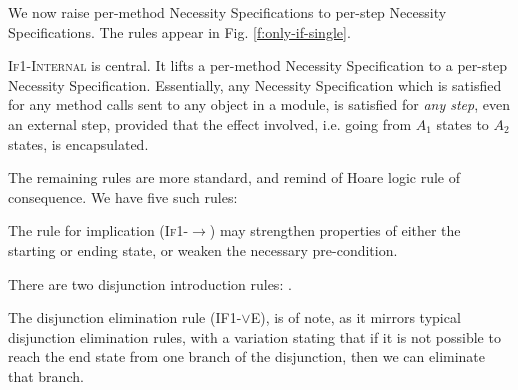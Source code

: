 We now raise per-method Necessity Specifications 
to per-step Necessity Specifications. 
The rules appear in Fig. \ref{f:only-if-single}.

\textsc{If1-Internal} is central. It
 lifts a per-method Necessity Specification to a per-step Necessity Specification.
Essentially, any Necessity Specification which is satisfied for any method
calls sent to any object in a module, is satisfied for \emph{any step}, even
an external step, provided that the effect involved, i.e. going from $A_1$ states to
$A_2$ states, is encapsulated.

 The remaining rules are more standard, and remind of Hoare logic rule of consequence.
 We have five such rules:
 
The  rule for implication (\textsc{If1-$\longrightarrow$}) may strengthen
 properties of either the starting or ending state, or 
weaken the necessary pre-condition. 

There are two disjunction introduction rules: 
.


The disjunction
elimination rule (\textsc{IF1-$\vee$E}), 
is of note, as it mirrors typical disjunction elimination
rules, with a variation stating that if it is not possible  to reach 
the end state from one branch of the disjunction, then we can eliminate 
that branch. 


